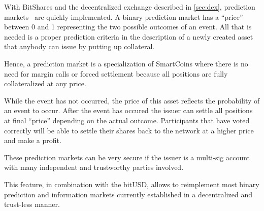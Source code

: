 With BitShares and the decentralized exchange described in \cref{sec:dex},
prediction markets~\cite{wiki_pm} are quickly implemented. A binary prediction
market has a ``price'' between 0 and 1 representing the two possible outcomes
of an event. All that is needed is a proper prediction criteria in the
description of a newly created asset that anybody can issue by putting up
collateral. 

Hence, a prediction market is a specialization of SmartCoins where there is no
need for margin calls or forced settlement because all positions are fully
collateralized at any price. 

While the event has not occurred, the price of this asset reflects the
probability of an event to occur. After the event has occured the issuer can
settle all positions at final ``price'' depending on the actual outcome.
Participants that have voted correctly will be able to settle their shares back
to the network at a higher price and make a profit.

These prediction markets can be very secure if the issuer is a multi-sig
account with many independent and trustworthy parties involved.

This feature, in combination with the bitUSD, allows to reimplement most binary
prediction and information markets currently established in a decentralized and
trust-less manner.
